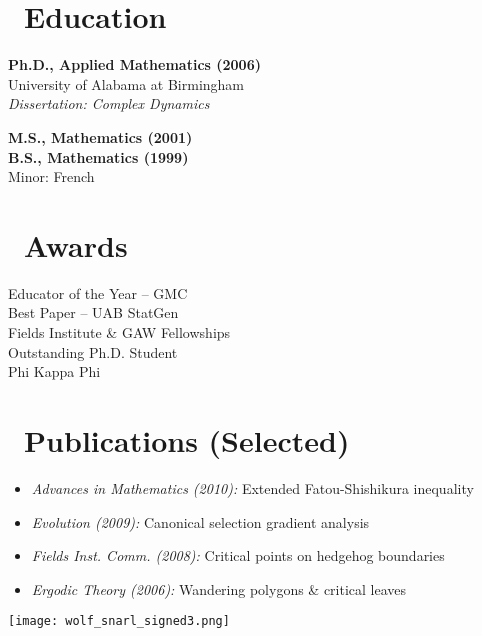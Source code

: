 \documentclass[a4paper,10pt]{article}
\begin{document}
\begin{multicols}{2}
\columnbreak

\section*{\faGraduationCap\ Education}
\textbf{Ph.D., Applied Mathematics (2006)}\\
University of Alabama at Birmingham\\
\textit{Dissertation: Complex Dynamics}

\textbf{M.S., Mathematics (2001)}\\
\textbf{B.S., Mathematics (1999)}\\
Minor: French

\section*{\faTrophy\ Awards}
Educator of the Year – GMC\\
Best Paper – UAB StatGen\\
Fields Institute \& GAW Fellowships\\
Outstanding Ph.D. Student\\
Phi Kappa Phi

\section*{\faBook\ Publications (Selected)}
\begin{itemize}[leftmargin=*]
    \item \textit{Advances in Mathematics (2010):} Extended Fatou-Shishikura inequality
    \item \textit{Evolution (2009):} Canonical selection gradient analysis
    \item \textit{Fields Inst. Comm. (2008):} Critical points on hedgehog boundaries
    \item \textit{Ergodic Theory (2006):} Wandering polygons \& critical leaves
\end{itemize}

\end{multicols}

\begin{center}
\texttt{[image: wolf\_snarl\_signed3.png]}
\end{center}
\end{document}

